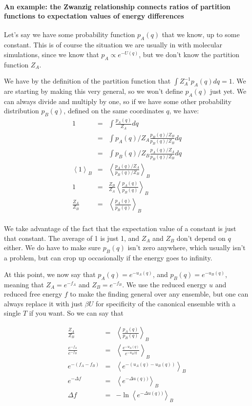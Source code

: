 \documentclass[9pt,bestpractices]{livecoms}
\begin{document}
\paragraph{An example: the Zwanzig relationship connects ratios of partition functions to expectation values of energy differences}

Let's say we have some probability function $p_A(q)$ that we know, up to some constant. This is of
course the situation we are usually in with molecular simulations, since we know that $p_A \propto e^{-U(q)}$, but we don't know the partition function $Z_A$.

We have by the definition of the partition function that $\int
Z_A^{-1} p_A(q) dq = 1$. We are starting by making this
very general, so we won't define $p_A(q)$ just yet. We can always
divide and multiply by one, so if we have some other probability
distribution $p_B(q)$, defined on the same coordinates $q$,
we have:
  \begin{eqnarray*}
    1 &=& \int \frac{p_A(q)}{Z_A} dq \\
      &=& \int p_A(q)/Z_A \frac{p_B(q)/Z_B}{p_B(q)/Z_B} dq \\
    &=& \int p_B(q)/Z_B \frac{p_A(q)/Z_A}{p_B(q)/Z_B} dq \\
    \left \langle 1 \right \rangle_B &=& \left \langle \frac{p_A(q)/Z_A}{p_B(q)/Z_B} \right \rangle_B \\
           1  &=& \frac{Z_B}{Z_A} \left \langle \frac{p_A(q)}{p_B(q)} \right \rangle_B \\
           \frac{Z_A}{Z_B}  &=& \left \langle \frac{p_A(q)}{p_B(q)} \right \rangle_B \\
  \end{eqnarray*}

We take advantage of the fact that the expectation value of a constant
is just that constant.  The average of 1 is just 1, and $Z_A$ and $Z_B$
don't depend on $q$ either. We do have to make sure $p_B(q)$
isn't zero anywhere, which usually isn't a problem, but can crop up
occasionally if the energy goes to infinity.

  At this point, we now say that $p_A(q) = e^{-u_A(q)}$,
  and $p_B(q) = e^{-u_B(q)}$, meaning that $Z_A = e^{-f_A}$
  and $Z_B = e^{-f_B}$.  We use the reduced energy $u$ and reduced free energy $f$ to make the finding general over any ensemble, but one can always replace it with just $\beta U$ for specificity of the canonical ensemble with a single $T$ if you want.  So we can say that 

  \begin{eqnarray}  
    \frac{Z_A}{Z_B}  &=& \left \langle \frac{p_A(q)}{p_B(q)} \right \rangle_B \nonumber \\
    \frac{e^{-f_A}}{e^{-f_B}}  &=& \left \langle \frac{ e^{-u_A(q)}}{ e^{-u_B(q}} \right\rangle_B \nonumber \\
      e^{-(f_A-f_B)}  &=& \left \langle e^{-(u_A(q)-u_B(q))}\right\rangle_B \nonumber \\
      e^{-\Delta f}  &=& \left \langle e^{-\Delta u(q))}\right\rangle_B \nonumber \\
    \Delta f  &=& - \ln \left \langle e^{-\Delta u(q))}\right\rangle_B \label{eq:zwanzig}
  \end{eqnarray}
\end{document}
